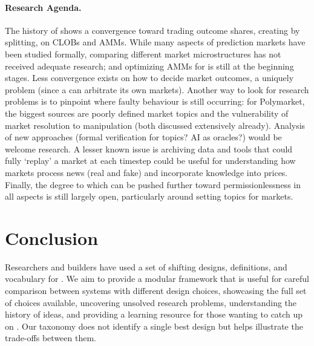
\paragraph{Research Agenda.}

The history of \depm shows a convergence toward trading outcome shares, creating by splitting, on CLOBs and AMMs. While many aspects of prediction markets have been studied formally, comparing different market microstructures has not received adequate research; and optimizing AMMs for \depms is still at the beginning stages. Less convergence exists on how to decide market outcomes, a uniquely \depm problem (since a \cepm can arbitrate its own markets). Another way to look for research problems is to pinpoint where faulty behaviour is still occurring: for Polymarket, the biggest sources are poorly defined market topics and the vulnerability of market resolution to manipulation (both discussed extensively already). Analysis of new approaches (formal verification for topics? AI as oracles?) would be welcome research. A lesser known issue is archiving \depm data and tools that could fully `replay' a market at each timestep could be useful for understanding how markets process news (real and fake) and incorporate knowledge into prices. Finally, the degree to which \depms can be pushed further toward permissionlessness in all aspects is still largely open, particularly around setting topics for markets.

\section{Conclusion}

Researchers and builders have used a set of shifting designs, definitions, and vocabulary for \depms. We aim to provide a modular framework that is useful for careful comparison between systems with different design choices, showcasing the full set of choices available, uncovering unsolved research problems, understanding the history of \depm ideas, and providing a learning resource for those wanting to catch up on \depms. Our taxonomy does not identify a single best design but helps illustrate the trade-offs between them. 




